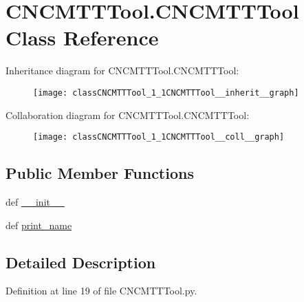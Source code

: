 \hypertarget{classCNCMTTTool_1_1CNCMTTTool}{\section{C\-N\-C\-M\-T\-T\-Tool.\-C\-N\-C\-M\-T\-T\-Tool Class Reference}
\label{classCNCMTTTool_1_1CNCMTTTool}
}


Inheritance diagram for C\-N\-C\-M\-T\-T\-Tool.\-C\-N\-C\-M\-T\-T\-Tool\-:\nopagebreak
\begin{figure}[H]
\begin{center}
\leavevmode
\texttt{[image: classCNCMTTTool\_1\_1CNCMTTTool\_\_inherit\_\_graph]}
\end{center}
\end{figure}


Collaboration diagram for C\-N\-C\-M\-T\-T\-Tool.\-C\-N\-C\-M\-T\-T\-Tool\-:\nopagebreak
\begin{figure}[H]
\begin{center}
\leavevmode
\texttt{[image: classCNCMTTTool\_1\_1CNCMTTTool\_\_coll\_\_graph]}
\end{center}
\end{figure}
\subsection*{Public Member Functions}
\begin{DoxyCompactItemize}
\item 
def \hyperlink{classCNCMTTTool_1_1CNCMTTTool_a9f2d86b7cd592cae84be27e90d65f862}{\-\_\-\-\_\-init\-\_\-\-\_\-}
\item 
def \hyperlink{classCNCMTTTool_1_1CNCMTTTool_a664d4cdf650553342d45bf04981a8e2d}{print\-\_\-name}
\end{DoxyCompactItemize}


\subsection{Detailed Description}


Definition at line 19 of file C\-N\-C\-M\-T\-T\-Tool.\-py.



